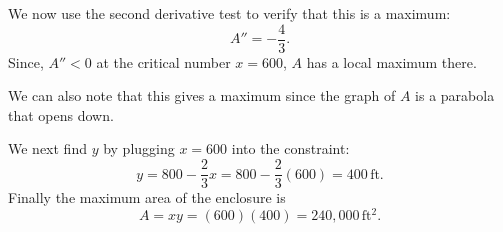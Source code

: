 \documentclass{ximera}
\begin{document}
\begin{example}[example 1]
We now use the second derivative test to verify that this is a maximum:
\[
A'' = -\frac43.
\]
Since, $A'' < 0$ at the critical number $x = 600$, $A$ has a local maximum there.

We can also note that this gives a maximum since the graph of $A$ is a parabola that opens down.


\begin{image}
\end{image}


We next find $y$ by plugging $x = 600$ into the constraint:
\[y = 800 - \frac23 x = 800 - \frac23(600) = 400 \,\mbox{ft.}\]
Finally the maximum area of the enclosure is
\[A = xy = (600)(400) = 240{,}000 \,\mbox{ft$^2$}.\]
\end{example}


\begin{center}
\begin{foldable}
\end{foldable}
\end{center}
\end{document}
